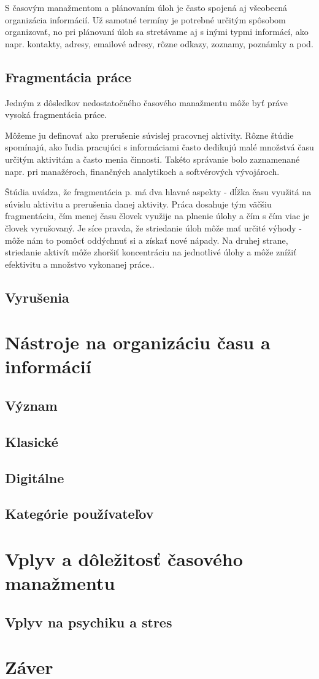 \documentclass[10pt,slovak,a4paper]{article}
\begin{document}
		S časovým manažmentom a plánovaním úloh je často spojená aj všeobecná organizácia informácií. Už samotné termíny je potrebné určitým spôsobom organizovať, no pri plánovaní úloh sa stretávame aj s inými typmi informácí, ako napr. kontakty, adresy, emailové adresy, rôzne odkazy, zoznamy, poznámky a pod.
	
	\subsection{Fragmentácia práce}
		Jedným z dôsledkov nedostatočného časového manažmentu môže byť práve vysoká fragmentácia práce.
		
		Môžeme ju definovať ako prerušenie súvislej pracovnej aktivity. Rôzne štúdie spomínajú, ako ľudia pracujúci s informáciami často dedikujú malé množstvá času určitým aktivitám a často menia činnosti. Takéto správanie bolo zaznamenané napr. pri manažéroch, finančných analytikoch a softvérových vývojároch\cite{NoTask}.
		
		Štúdia\cite{NoTask} uvádza, že fragmentácia p. má dva hlavné aspekty - dĺžka času využitá na súvislu aktivitu a prerušenia danej aktivity. Práca dosahuje tým väčšiu fragmentáciu, čím menej času človek využije na plnenie úlohy a čím s čím viac je človek vyrušovaný. Je síce pravda, že striedanie úloh môže mať určité výhody - môže nám to pomôcť oddýchnuť si a získať nové nápady. Na druhej strane, striedanie aktivít môže zhoršiť koncentráciu na jednotlivé úlohy a môže znížiť efektivitu a množstvo vykonanej práce.\cite{NoTask}.
		
	\subsection{Vyrušenia}

\section{Nástroje na organizáciu času a informácií}
	\subsection{Význam}
	\subsection{Klasické}
	\subsection{Digitálne}
	\subsection{Kategórie používateľov}

\section{Vplyv a dôležitosť časového manažmentu}
% 
	\subsection{Vplyv na psychiku a stres}
\section{Záver}



\end{document}
